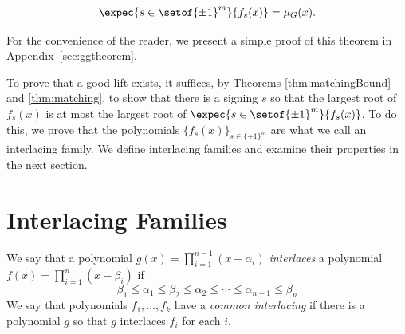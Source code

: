 \documentclass[11pt]{article}
\newcommand{\dan}[1]{{\bf \color{blue} Dan: #1}}
\newcommand{\nikhil}[1]{{\bf \color{green} Nikhil: #1}}
\begin{document}
\begin{theorem}\label{thm:matching}
\[
\expec{s \in \setof{\pm 1}^{m}}{f_{s} (x)}
 = 
 \mu_{G} (x).
\]
\end{theorem}

For the convenience of the reader, we present a simple proof of this theorem
  in Appendix~\ref{sec:ggtheorem}.

To prove that a good lift exists, it suffices, by Theorems
\ref{thm:matchingBound} and \ref{thm:matching}, to show that there is a signing $s$ so that the largest root of
  $f_{s} (x)$ is at most the largest root of $\expec{s \in \setof{\pm
1}^{m}}{f_{s} (x)}$.
To do this, we prove that the polynomials $\{f_{s} (x)\}_{s\in\{\pm 1\}^m}$
  are what we call an interlacing family.
We define interlacing families and examine their properties in the next section.


\section{Interlacing Families}\label{sec:interlacing}


\begin{definition}\label{def:interlacing}
We say that a polynomial $g(x) = \prod_{i=1}^{n-1} (x - \alpha_{i})$ \emph{interlaces} a polynomial 
  $f(x) = \prod_{i=1}^{n} (x - \beta_{i})$ if
\[
  \beta_{1} \leq \alpha_{1} \leq \beta_{2} \leq \alpha_{2} \leq \dotsb \leq
  \alpha_{n-1}\leq \beta_{n} 
\]
We say that polynomials $f_{1}, \dotsc , f_{k}$ have a \emph{common interlacing}
  if there is a polynomial $g$ so that $g$ interlaces $f_i$ for each $i$.
\end{definition}
\end{document}
